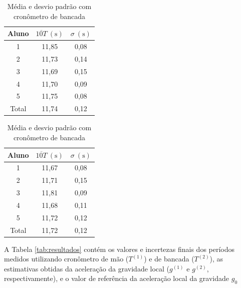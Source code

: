 \documentclass[12pt, a4paper, brazil]{article}
\begin{document}
\begin{table}[H]
	\centering
	\begin{minipage}{0.48\textwidth}
		\centering
		\caption{Média e desvio padrão das medições com cronômetro de mão}
		\begin{tabular}{c c c}
			\hline
			Aluno & $\overline{10T}\ \mathrm{(s)}$ & $\sigma\ \mathrm{(s)}$ \\ [0.5ex]
			\hline
			1     & 11,85                          & 0,08                   \\
			2     & 11,73                          & 0,14                   \\
			3     & 11,69                          & 0,15                   \\
			4     & 11,70                          & 0,09                   \\
			5     & 11,75                          & 0,08                   \\
			\hline
			Total & 11,74                          & 0,12                   \\
			\hline
		\end{tabular}
		\label{tab:medias_cm}
	\end{minipage}
	\hfill
	\begin{minipage}{0.48\textwidth}
		\centering
		\caption{Média e desvio padrão com cronômetro de bancada}
		\begin{tabular}{c c c}
			\hline
			Aluno & $\overline{10T}\ \mathrm{(s)}$ & $\sigma\ \mathrm{(s)}$ \\ [0.5ex]
			\hline
			1     & 11,67                          & 0,08                   \\
			2     & 11,71                          & 0,15                   \\
			3     & 11,81                          & 0,09                   \\
			4     & 11,68                          & 0,11                   \\
			5     & 11,72                          & 0,12                   \\
			\hline
			Total & 11,72                          & 0,12                   \\
			\hline
		\end{tabular}
		\label{tab:medias_cb}
	\end{minipage}
\end{table}

A Tabela \ref{tab:resultados} contém os valores e incertezas finais dos períodos medidos utilizando cronômetro de mão ($T^{(1)}$) e de bancada ($T^{(2)}$), as estimativas obtidas da aceleração da gravidade local ($g^{(1)}$ e $g^{(2)}$, respectivamente), e o valor de referência da aceleração local da gravidade $g_{0}$
\end{document}
